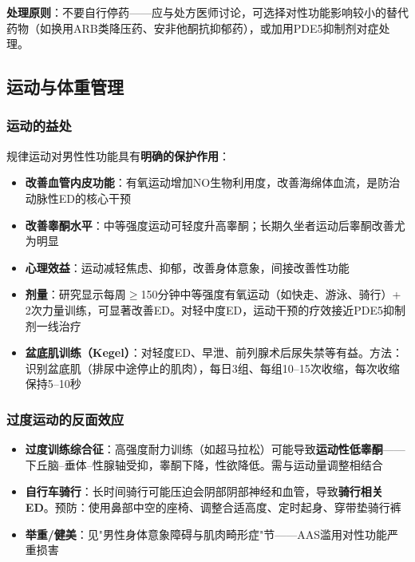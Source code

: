 \begin{enumerate}
\textbf{处理原则}：不要自行停药——应与处方医师讨论，可选择对性功能影响较小的替代药物（如换用ARB类降压药、安非他酮抗抑郁药），或加用PDE5抑制剂对症处理。

\subsection{运动与体重管理}

\subsubsection{运动的益处}

规律运动对男性性功能具有\textbf{明确的保护作用}：

\begin{itemize}[leftmargin=2cm]
	\item \textbf{改善血管内皮功能}：有氧运动增加NO生物利用度，改善海绵体血流，是防治动脉性ED的核心干预
	\item \textbf{改善睾酮水平}：中等强度运动可轻度升高睾酮；长期久坐者运动后睾酮改善尤为明显
	\item \textbf{心理效益}：运动减轻焦虑、抑郁，改善身体意象，间接改善性功能
	\item \textbf{剂量}：研究显示每周$\ge$150分钟中等强度有氧运动（如快走、游泳、骑行）+ 2次力量训练，可显著改善ED。对轻中度ED，运动干预的疗效接近PDE5抑制剂一线治疗
	\item \textbf{盆底肌训练（Kegel）}：对轻度ED、早泄、前列腺术后尿失禁等有益。方法：识别盆底肌（排尿中途停止的肌肉），每日3组、每组10--15次收缩，每次收缩保持5--10秒
\end{itemize}

\subsubsection{过度运动的反面效应}

\begin{itemize}[leftmargin=2cm]
	\item \textbf{过度训练综合征}：高强度耐力训练（如超马拉松）可能导致\textbf{运动性低睾酮}——下丘脑--垂体--性腺轴受抑，睾酮下降，性欲降低。需与运动量调整相结合
	\item \textbf{自行车骑行}：长时间骑行可能压迫会阴部阴部神经和血管，导致\textbf{骑行相关ED}。预防：使用鼻部中空的座椅、调整合适高度、定时起身、穿带垫骑行裤
	\item \textbf{举重/健美}：见"男性身体意象障碍与肌肉畸形症"节——AAS滥用对性功能严重损害
\end{itemize}


\end{enumerate}
